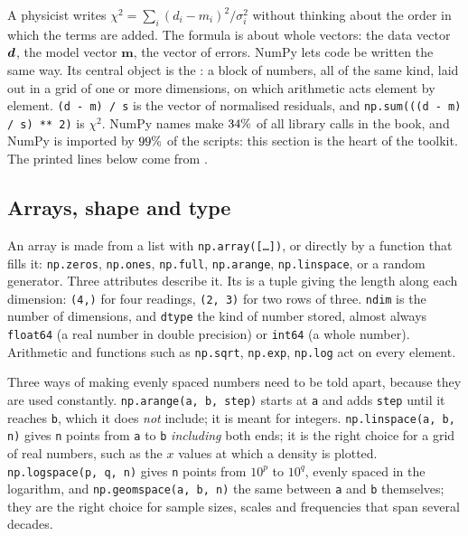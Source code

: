 A physicist writes $\chi^2=\sum_i (d_i-m_i)^2/\sigma_i^2$ without thinking about the order in which the terms are added. The formula is about whole vectors: the data vector $\bm{d}$, the model vector $\bm m$, the vector of errors. NumPy lets code be written the same way. Its central object is the : a block of numbers, all of the same kind, laid out in a grid of one or more dimensions, on which arithmetic acts element by element. \texttt{(d - m) / s} is the vector of normalised residuals, and \texttt{np.sum(((d - m) / s) ** 2)} is $\chi^2$. NumPy names make $34\%$ of all library calls in the book, and NumPy is imported by $99\%$ of the scripts: this section is the heart of the toolkit. The printed lines below come from .

\subsection{Arrays, shape and type}
\label{T0a:sec:arrays}

An array is made from a list with \texttt{np.array([\dots])}, or directly by a function that fills it: \texttt{np.zeros}, \texttt{np.ones}, \texttt{np.full}, \texttt{np.arange}, \texttt{np.linspace}, or a random generator. Three attributes describe it. Its  is a tuple giving the length along each dimension: \texttt{(4,)} for four readings, \texttt{(2, 3)} for two rows of three. \texttt{ndim} is the number of dimensions, and \texttt{dtype} the kind of number stored, almost always \texttt{float64} (a real number in double precision) or \texttt{int64} (a whole number). Arithmetic and functions such as \texttt{np.sqrt}, \texttt{np.exp}, \texttt{np.log} act on every element.


Three ways of making evenly spaced numbers need to be told apart, because they are used constantly. \texttt{np.arange(a, b, step)} starts at \texttt{a} and adds \texttt{step} until it reaches \texttt{b}, which it does \emph{not} include; it is meant for integers. \texttt{np.linspace(a, b, n)} gives \texttt{n} points from \texttt{a} to \texttt{b} \emph{including} both ends; it is the right choice for a grid of real numbers, such as the $x$ values at which a density is plotted. \texttt{np.logspace(p, q, n)} gives \texttt{n} points from $10^p$ to $10^q$, evenly spaced in the logarithm, and \texttt{np.geomspace(a, b, n)} the same between \texttt{a} and \texttt{b} themselves; they are the right choice for sample sizes, scales and frequencies that span several decades.

